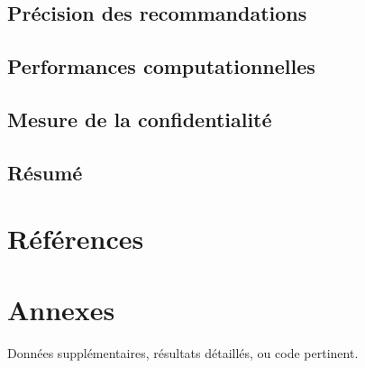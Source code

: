 \documentclass{article}
\begin{document}
\subsection{Précision des recommandations}
\subsection{Performances computationnelles}
\subsection{Mesure de la confidentialité}
\subsection{Résumé}

\section*{Références}

\appendix
\section*{Annexes}
Données supplémentaires, résultats détaillés, ou code pertinent.
\end{document}
